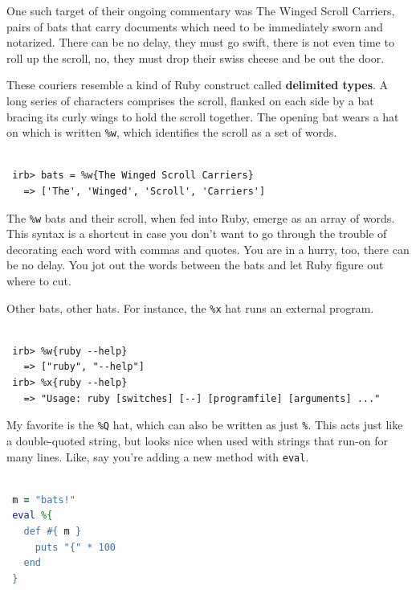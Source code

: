 \documentclass[10pt,twoside]{report}
\begin{document}
One such target of their ongoing commentary was The Winged Scroll
Carriers, pairs of bats that carry documents which need to be
immediately sworn and notarized.  There can be no delay, they must go
swift, there is not even time to roll up the scroll, no, they must
drop their swiss cheese and be out the door.

These couriers resemble a kind of Ruby construct called {\bf delimited
  types}.  A long series of characters comprises the scroll, flanked
on each side by a bat bracing its curly wings to hold the scroll
together. The opening bat wears a hat on which is written
\lstinline[breaklines=true]|%w|, which identifies the scroll as a set
of words.


\begin{lstlisting}

 irb> bats = %w{The Winged Scroll Carriers}
   => ['The', 'Winged', 'Scroll', 'Carriers']

\end{lstlisting}


The \lstinline[breaklines=true]|%w| bats and their scroll, when fed
into Ruby, emerge as an array of words.  This syntax is a shortcut in
case you don't want to go through the trouble of decorating each word
with commas and quotes.  You are in a hurry, too, there can be no
delay.  You jot out the words between the bats and let Ruby figure out
where to cut.

Other bats, other hats.  For instance, the
\lstinline[breaklines=true]|%x| hat runs an external program.


\begin{lstlisting}

 irb> %w{ruby --help}
   => ["ruby", "--help"]
 irb> %x{ruby --help}
   => "Usage: ruby [switches] [--] [programfile] [arguments] ..."

\end{lstlisting}


My favorite is the \lstinline[breaklines=true]|%Q| hat, which can also
be written as just \lstinline[breaklines=true]|%|.  This acts just
like a double-quoted string, but looks nice when used with strings
that run-on for many lines.  Like, say you're adding a new method with
\lstinline[breaklines=true]|eval|.


\begin{lstlisting}[basicstyle=\ttfamily\color{basiccolor},
    commentstyle = \ttfamily\color{commentcolor},
    keywordstyle=\ttfamily\color{keywordscolor},
    stringstyle=\color{stringcolor},
    language=Ruby,
    basicstyle=\small\ttfamily,
    showstringspaces=false,
  ]

 m = "bats!"
 eval %{
   def #{ m }
     puts "{" * 100
   end
 }

\end{lstlisting}
\end{document}
